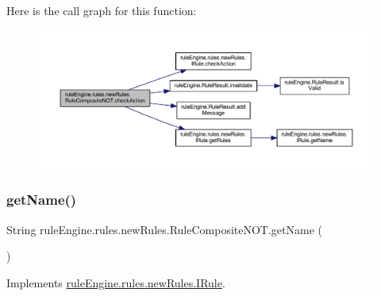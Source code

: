 Here is the call graph for this function\+:
\nopagebreak
\begin{figure}[H]
\begin{center}
\leavevmode
\includegraphics[width=350pt]{classrule_engine_1_1rules_1_1new_rules_1_1_rule_composite_n_o_t_a58fe12e7cdc5cdcff6d0df2c67ecedb8_cgraph}
\end{center}
\end{figure}
\mbox{\label{classrule_engine_1_1rules_1_1new_rules_1_1_rule_composite_n_o_t_a1d11d1d08a50f98b26109859ae453aaa}} 
\subsubsection{\texorpdfstring{get\+Name()}{getName()}}
{\footnotesize\ttfamily String rule\+Engine.\+rules.\+new\+Rules.\+Rule\+Composite\+N\+O\+T.\+get\+Name (\begin{DoxyParamCaption}{ }\end{DoxyParamCaption})\hspace{0.3cm}{\ttfamily [inline]}}



Implements \mbox{\hyperlink{interfacerule_engine_1_1rules_1_1new_rules_1_1_i_rule_a99e11d165ca863908c6e985a79917067}{rule\+Engine.\+rules.\+new\+Rules.\+I\+Rule}}.

